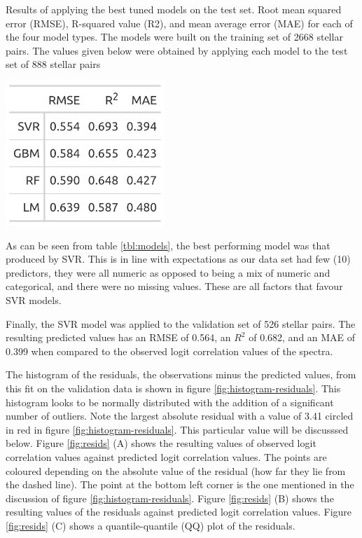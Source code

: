 \documentclass[preprint, 3p,
authoryear]{elsarticle} %
\begin{document}
\begin{table}
  \centering
  \caption{Results of applying the best tuned models on the test set. Root mean squared error (RMSE), R-squared value (R2), and mean average error (MAE) for each of the four model types. The models were built on the training set of 2668 stellar pairs. The values given below were obtained by applying each model to the test set of 888 stellar pairs}
  \label{tbl:models}
  \includegraphics[width=6cm]{figures/model-values-test}
\end{table}

As can be seen from table \ref{tbl:models}, the best performing model
was that produced by SVR. This is in line with expectations as our data
set had few (10) predictors, they were all numeric as opposed to being a
mix of numeric and categorical, and there were no missing values. These
are all factors that favour SVR models.

Finally, the SVR model was applied to the validation set of 526 stellar
pairs. The resulting predicted values has an RMSE of 0.564, an \(R^2\)
of 0.682, and an MAE of 0.399 when compared to the observed logit
correlation values of the spectra.

The histogram of the residuals, the observations minus the predicted
values, from this fit on the validation data is shown in figure
\ref{fig:histogram-residuals}. This histogram looks to be normally
distributed with the addition of a significant number of outliers. Note
the largest absolute residual with a value of 3.41 circled in red in
figure \ref{fig:histogram-residuals}. This particular value will be
discusssed below. Figure \ref{fig:resids} (A) shows the resulting values
of observed logit correlation values against predicted logit correlation
values. The points are coloured depending on the absolute value of the
residual (how far they lie from the dashed line). The point at the
bottom left corner is the one mentioned in the discussion of figure
\ref{fig:histogram-residuals}. Figure \ref{fig:resids} (B) shows the
resulting values of the residuals against predicted logit correlation
values. Figure \ref{fig:resids} (C) shows a quantile-quantile (QQ) plot
of the residuals.
\end{document}
